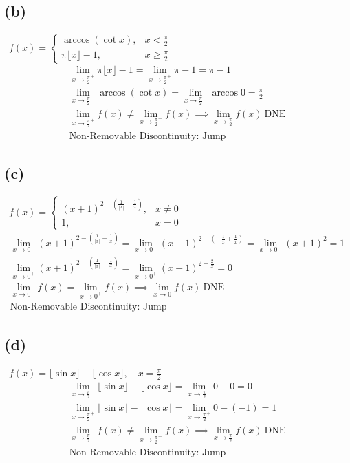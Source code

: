 \documentclass[12pt]{article}
\newcommand{\dne}{\ \mathrm{DNE}}
\newcommand{\floor}[1]{\lfloor #1 \rfloor}
\newcommand{\sub}[1]{\subsection{(#1)} \,}
\begin{document}
\sub{b} $f(x) = 
    \begin{cases}
    \arccos(\cot x), & x < \frac{\pi}{2} \\
    \pi \lfloor x \rfloor - 1, & x \ge \frac{\pi}{2}
    \end{cases}$
\begin{gather*}
    \lim_{x\to\frac{\pi}{2}^+} \pi\floor{x}-1=\lim_{x\to\frac{\pi}{2}^+}\pi-1=\pi-1\\
    \lim_{x\to\frac{\pi}{2}^-} \arccos(\cot x)=\lim_{x\to\frac{\pi}{2}^-}\arccos 0=\frac{\pi}{2}\\
    \lim_{x\to\frac{\pi}{2}^+} f(x) \ne \lim_{x\to\frac{\pi}{2}^-} f(x) \implies \lim_{x\to\frac{\pi}{2}} f(x) \dne\\
    \boxed{\text{Non-Removable Discontinuity: Jump}}
\end{gather*}

\sub{c} $f(x) = 
    \begin{cases}
    (x+1)^{2 - \left(\frac{1}{|x|} + \frac{1}{x}\right)}, & x \neq 0 \\
    1, & x = 0
    \end{cases}$
\begin{gather*}
    \lim_{x\to0^-}  (x+1)^{2 - \left(\frac{1}{|x|} + \frac{1}{x}\right)}=\lim_{x\to0^-}(x+1)^{2 - \left(-\frac{1}{x} + \frac{1}{x}\right)}=\lim_{x\to0^-}(x+1)^2=1\\
    \lim_{x\to0^+}(x+1)^{2 - \left(\frac{1}{|x|} + \frac{1}{x}\right)}=\lim_{x\to0^+}(x+1)^{2 - \frac{2}{x}}=0\\
    \lim_{x\to0^-} f(x) = \lim_{x\to0^+} f(x) \implies \lim_{x\to0} f(x) \dne\\
    \boxed{\text{Non-Removable Discontinuity: Jump}}
\end{gather*}

\sub{d} $f(x) = \floor{\sin x}-\floor{\cos x}, \quad x = \frac{\pi}{2}$
\begin{gather*}
    \lim_{x \to \frac{\pi}{2}^-}\floor{\sin x}-\floor{\cos x}=\lim_{x \to \frac{\pi}{2}^-}0-0=0\\
    \lim_{x \to \frac{\pi}{2}^+}\floor{\sin x}-\floor{\cos x}=\lim_{x \to \frac{\pi}{2}^+}0-(-1)=1\\
    \lim_{x \to \frac{\pi}{2}^-}f(x) \ne \lim_{x \to \frac{\pi}{2}^+} f(x) \implies \lim_{x \to \frac{\pi}{2}}f(x) \dne \\
    \boxed{\text{Non-Removable Discontinuity: Jump}}
\end{gather*}
 
\end{document}
